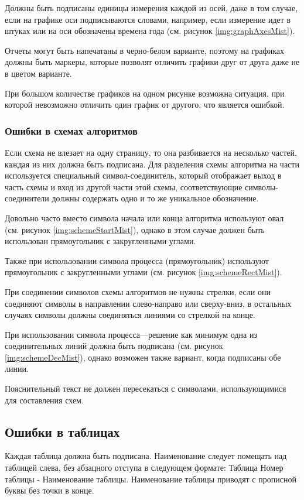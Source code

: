 Должны быть подписаны единицы измерения каждой из осей, даже в том случае, если на графике оси подписываются словами, например, если измерение идет в штуках или на оси обозначены времена года (см. рисунок \ref{img:graphAxesMist}).

Отчеты могут быть напечатаны в черно-белом варианте, поэтому на графиках должны быть маркеры, которые позволят отличить графики друг от друга даже не в цветом варианте.

При большом количестве графиков на одном рисунке возможна ситуация, при которой невозможно отличить один график от другого, что является ошибкой.

\subsubsection{Ошибки в схемах алгоритмов}
Если схема не влезает на одну страницу, то она разбивается на несколько частей, каждая из них должна быть подписана. Для разделения схемы алгоритма на части используется специальный символ-соединитель, который отображает выход в часть схемы и вход из другой части этой схемы, соответствующие символы-соединители должны содержать одно и то же уникальное обозначение.

Довольно часто вместо символа начала или конца алгоритма используют овал (см. рисунок \ref{img:schemeStartMist}), однако в этом случае должен быть использован прямоугольник с закругленными углами.

Также при использовании символа процесса (прямоугольник) используют прямоугольник с закругленными углами (см. рисунок \ref{img:schemeRectMist}).

При соединении символов схемы алгоритмов не нужны стрелки, если они соединяют символы в направлении слево-направо или сверху-вниз, в остальных случаях символы должны соединяться линиями со стрелкой на конце.

При использовании символа процесса---решение как минимум одна из соединительных линий должна быть подписана (см. рисунок \ref{img:schemeDecMist}), однако возможен также вариант, когда подписаны обе линии.

Пояснительный текст не должен пересекаться с символами, использующимися для составления схем.

\subsection{Ошибки в таблицах}
Каждая таблица должна быть подписана. Наименование следует помещать над таблицей слева, без абзацного отступа в следующем формате: Таблица Номер таблицы - Наименование таблицы. Наименование таблицы приводят с прописной буквы без точки в конце\cite{GOST732}.

